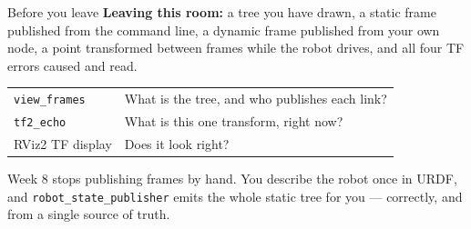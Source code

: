 \documentclass[aspectratio=169]{beamer}
\begin{document}
\begin{frame}{Before you leave}
  \small
  \textbf{Leaving this room:} a tree you have drawn, a static frame published from the command
  line, a dynamic frame published from your own node, a point transformed between frames while
  the robot drives, and all four TF errors caused and read.

  \vspace{0.7em}
  \begin{center}
  \begin{tabular}{@{}ll@{}}
    \toprule
    \texttt{view\_frames} & What is the tree, and who publishes each link? \\
    \texttt{tf2\_echo} & What is this one transform, right now? \\
    RViz2 TF display & Does it look right? \\
    \bottomrule
  \end{tabular}
  \end{center}

  \vspace{0.6em}
  \begin{underhood}
    \footnotesize
    Week 8 stops publishing frames by hand. You describe the robot once in URDF, and
    \texttt{robot\_state\_publisher} emits the whole static tree for you --- correctly, and from
    a single source of truth.
  \end{underhood}
\end{frame}
\end{document}

